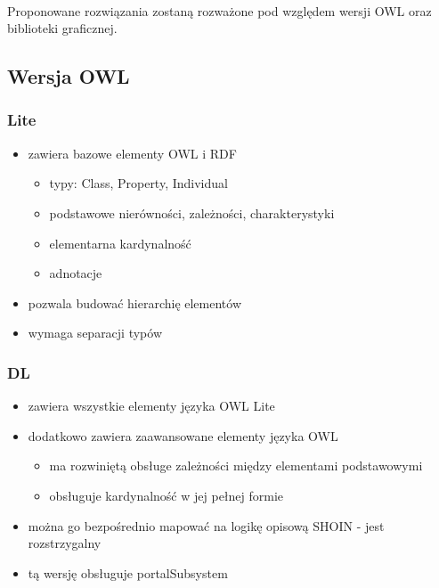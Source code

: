 \documentclass[a4paper,10pt]{article}
\begin{document}
\paragraph{} Proponowane rozwiązania zostaną rozważone pod względem wersji OWL oraz biblioteki graficznej.

\subsection{Wersja OWL}

\subsubsection{Lite}
	\begin{itemize}
	 \item zawiera bazowe elementy OWL i RDF
		\begin{itemize}
 		\item typy: Class, Property, Individual
		\item podstawowe nierówności, zależności, charakterystyki
		\item elementarna kardynalność
		\item adnotacje
		\end{itemize}
	\item pozwala budować hierarchię elementów
	\item wymaga separacji typów
	\end{itemize}

\subsubsection{DL}
	\begin{itemize}
	\item zawiera wszystkie elementy języka OWL Lite
	\item dodatkowo zawiera zaawansowane elementy języka OWL
		\begin{itemize}
 		\item ma rozwiniętą obsługe zależności między elementami podstawowymi
		\item obsługuje kardynalność w jej pełnej formie
		\end{itemize}
	\item można go bezpośrednio mapować na logikę opisową SHOIN - jest rozstrzygalny
	\item tą wersję obsługuje portalSubsystem
	\end{itemize}
\end{document}
